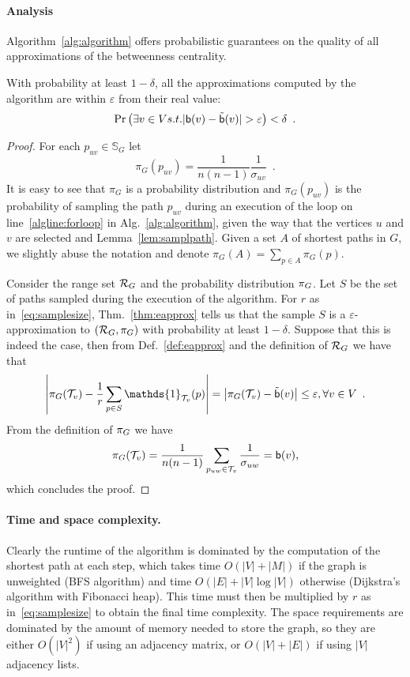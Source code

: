 \paragraph{Analysis}\label{sec:analysis}
Algorithm~\ref{alg:algorithm} offers
probabilistic guarantees on the quality of all approximations of the betweenness
centrality.
\begin{lemma}\label{lem:correctness}
  With probability at least $1-\delta$, all the approximations computed by the
  algorithm are within $\varepsilon$ from their real value:
  \[
  \Pr\left(\exists v\in V \mbox{ s.t. }
  |\betw(v)-\tilde\betw(v)|>\varepsilon\right)<\delta\enspace .
  \]
\end{lemma}

\begin{proof}
  For each $p_{uv}\in\mathbb{S}_G$ let
  \[
  \pi_G(p_{uv})=\frac{1}{n(n-1)}\frac{1}{\sigma_{uv}}\enspace.
  \]
  It is easy to see that $\pi_G$ is a probability distribution and
  $\pi_G(p_{uv})$ is the probability of sampling the path $p_{uv}$ during an
  execution of the loop on line~\ref{algline:forloop} in
  Alg.~\ref{alg:algorithm}, given the way that the vertices $u$ and $v$ are
  selected and Lemma~\ref{lem:samplpath}. Given a set $A$ of shortest paths in
  $G$, we slightly abuse the notation and denote $\pi_G(A)=\sum_{p\in A}
  \pi_G(p)$.
  
  Consider the range set $\mathcal{R}_G$ and the probability distribution $\pi_G$.
  Let $S$ be the set of paths sampled during the execution of the algorithm.
  For $r$ as in~\eqref{eq:samplesize}, Thm.~\ref{thm:eapprox} tells us that the sample $S$ is a
  $\varepsilon$-approximation to $(\mathcal{R}_G,\pi_G)$ with probability at least
  $1-\delta$. Suppose that this is indeed the case, then from
  Def.~\ref{def:eapprox} and the definition of $\mathcal{R}_G$ we have that
  \[
  \left|\prob_G(\mathcal{T}_v) - \frac{1}{r}\sum_{p\in
  S}\mathds{1}_{\mathcal{T}_v}(p)\right|=\left|\prob_G(\mathcal{T}_v) -
  \tilde\betw(v)\right|\le\varepsilon, \forall v\in
  V\enspace.
  \]
  From the definition of $\pi_G$ we have
  \[
  \pi_G(\mathcal{T}_v)=\frac{1}{n(n-1)}\sum_{p_{uw}\in\mathcal{T}_v}\frac{1}{\sigma_{uw}}=\mathsf{b}(v),
  \]
  which concludes the proof.
\end{proof}

\ifproof
\paragraph{Time and space complexity.} Clearly the runtime of the algorithm is
dominated by the computation of the shortest path at each step, which takes time
$O(|V|+|M|)$ if the graph is unweighted (BFS algorithm) and time
$O(|E|+|V|\log|V|)$ otherwise (Dijkstra's algorithm with Fibonacci heap).
This time must then be multiplied by $r$ as in~\eqref{eq:samplesize} to obtain
the final time complexity. The space requirements are dominated by the amount of
memory needed to store the graph, so they are either $O(|V|^2)$ if using an
adjacency matrix, or $O(|V|+|E|)$ if using $|V|$ adjacency lists.
\fi

